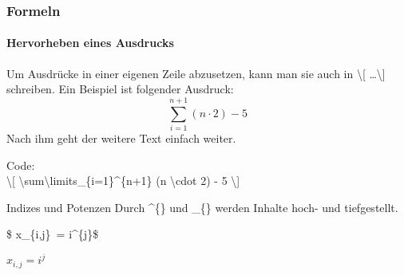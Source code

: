 \begin{frame}
\frametitle{Formeln}
\framesubtitle{Hervorheben eines Ausdrucks}



Um Ausdrücke in einer eigenen Zeile abzusetzen, kann man sie auch in {\ttfamily\color{unibayellowI}\textbackslash [\color{nounibaredI} \ldots \color{unibayellowI}\textbackslash ]} schreiben. 
Ein Beispiel ist folgender Ausdruck:
\[ \sum\limits_{i=1}^{n+1} (n \cdot 2) - 5 \]
Nach ihm geht der weitere Text einfach weiter.

\medskip

Code:\\
{\ttfamily \color{unibayellowI}\textbackslash [	\color{nounibaredI}\textbackslash\color{nounibaredI}sum\textbackslash  limits\_\color{black}\{i=1\}\color{nounibaredI}\^{}\color{black}\{n+1\} (n \color{nounibaredI}\textbackslash \color{nounibaredI}cdot \color{black}2) - 5 \color{unibayellowI}\textbackslash ]}

\medskip

\begin{block}{Indizes und Potenzen}
Durch {\ttfamily \color{nounibaredI}\^{}\color{black}\{\} und \color{nounibaredI}\_\color{black}\{\} } werden Inhalte hoch- und tiefgestellt.

\begin{center}
{\ttfamily \color{unibayellowI}\$%
\color{black}x\color{nounibaredI}\_\color{black}\{i,j\}\color{black}~= i\color{nounibaredI}\^{}\color{black}\{j\}\color{unibayellowI}\$}

\medskip
 
$x_{i,j} = i^{j}$
\end{center}

\vspace{-2mm}

\end{block}
\vspace{-5mm}

\end{frame}







